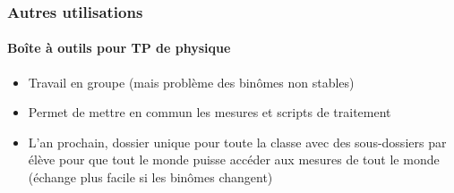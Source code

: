 \begin{frame}
	\frametitle{Autres utilisations}
	\framesubtitle{Boîte à outils pour TP de physique}


	\begin{itemize}[<+->]
		\item Travail en groupe (mais problème des binômes non stables)

		\item Permet de mettre en commun les mesures et scripts de traitement

		\item L'an prochain, dossier unique pour toute la classe avec des sous-dossiers par élève pour que tout le monde puisse accéder aux mesures de tout le monde (échange plus facile si les binômes changent)
	\end{itemize}
\end{frame}
